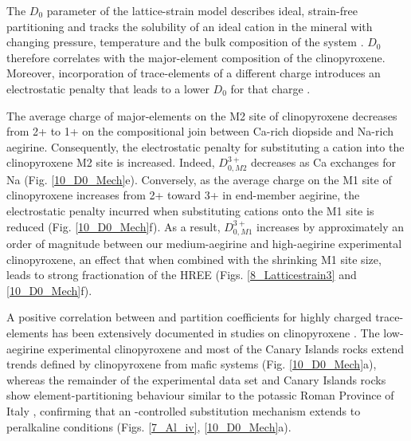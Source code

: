 \documentclass[review,authoryear,12pt]{elsarticle}
\begin{document}
	The $D_0$ parameter of the lattice-strain model describes ideal, strain-free partitioning and tracks the solubility of an ideal cation in the mineral with changing pressure, temperature and the bulk composition of the system \citep{Wood2014}. $D_0$ therefore correlates with the major-element composition of the clinopyroxene. Moreover, incorporation of trace-elements of a different charge introduces an electrostatic penalty that leads to a lower $D_0$ for that charge \citep{Wood2001charge, Wood2003}.
	
	The average charge of major-elements on the M2 site of clinopyroxene decreases from 2+ to 1+ on the compositional join between Ca-rich diopside and Na-rich aegirine. Consequently, the electrostatic penalty for substituting a  cation into the clinopyroxene M2 site is increased. Indeed, $D_{0, M2}^{3+}$ decreases as Ca exchanges for Na (Fig. \ref{10_D0_Mech}e).
	Conversely, as the average charge on the M1 site of clinopyroxene increases from 2+ toward 3+ in end-member aegirine, the electrostatic penalty incurred when substituting  cations onto the M1 site is reduced (Fig. \ref{10_D0_Mech}f). As a result, $D_{0, M1}^{3+}$ increases by approximately an order of magnitude between our medium-aegirine and high-aegirine experimental clinopyroxene, an effect that when combined with the shrinking M1 site size, leads to strong fractionation of the HREE (Figs. \ref{8_Latticestrain3} and \ref{10_D0_Mech}f).

	A positive correlation between  and partition coefficients for highly charged trace-elements has been extensively documented in studies on clinopyroxene \citep{Lundstrom1994, Gaetani1995, Blundy1998, Francis2008, Hill2011, Mollo2016}. The low-aegirine experimental clinopyroxene and most of the Canary Islands rocks extend trends defined by clinopyroxene from mafic systems (Fig. \ref{10_D0_Mech}a), whereas the remainder of the experimental data set and Canary Islands rocks show element-partitioning behaviour similar to the potassic Roman Province of Italy \citep{Wood2001cpx, Fedele2009, Mollo2016}, confirming that an -controlled substitution mechanism extends to peralkaline conditions (Figs. \ref{7_Al_iv}, \ref{10_D0_Mech}a).
		
\end{document}
